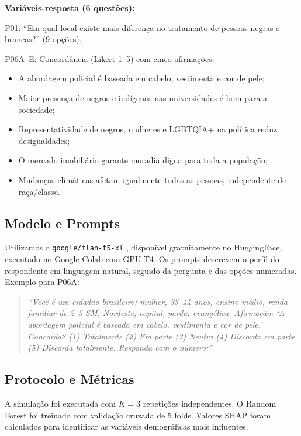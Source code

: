 \documentclass[12pt]{article}
\begin{document}
\textbf{Variáveis-resposta (6 questões):}

P01: ``Em qual local existe mais diferença no tratamento de pessoas negras
e brancas?'' (9 opções).

P06A--E: Concordância (Likert 1--5) com cinco afirmações:
\begin{itemize}
  \item[A:] A abordagem policial é baseada em cabelo, vestimenta e cor de pele;
  \item[B:] Maior presença de negros e indígenas nas universidades é bom para a sociedade;
  \item[C:] Representatividade de negros, mulheres e LGBTQIA+ na política reduz desigualdades;
  \item[D:] O mercado imobiliário garante moradia digna para toda a população;
  \item[E:] Mudanças climáticas afetam igualmente todas as pessoas, independente de raça/classe.
\end{itemize}

\subsection{Modelo e Prompts}

Utilizamos o \texttt{google/flan-t5-xl} \cite{chung2022}, disponível
gratuitamente no HuggingFace, executado no Google Colab com GPU T4.
Os prompts descrevem o perfil do respondente em linguagem natural,
seguido da pergunta e das opções numeradas. Exemplo para P06A:

\begin{quote}
\small
\textit{``Você é um cidadão brasileiro: mulher, 35--44 anos, ensino médio,
renda familiar de 2--5 SM, Nordeste, capital, parda, evangélica. Afirmação:
`A abordagem policial é baseada em cabelo, vestimenta e cor de pele.'
Concorda? (1) Totalmente (2) Em parte (3) Neutro (4) Discorda em parte
(5) Discorda totalmente. Responda com o número:''}
\end{quote}

\subsection{Protocolo e Métricas}

A simulação foi executada com $K=3$ repetições independentes. O Random
Forest \cite{breiman2001} foi treinado com validação cruzada de 5 folds.
Valores SHAP \cite{lundberg2017} foram calculados para identificar as
variáveis demográficas mais influentes.
\end{document}
